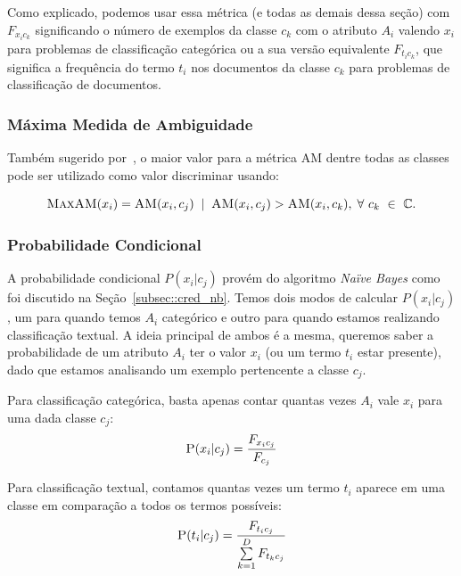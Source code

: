 Como explicado, podemos usar essa métrica (e todas as demais dessa seção) com $F_{x_{i}c_{k}}$ significando o número de exemplos da classe $c_k$ com o atributo $A_i$ valendo $x_i$ para problemas de classificação categórica ou a sua versão equivalente $F_{t_{i}c_{k}}$, que significa a frequência do termo $t_i$ nos documentos da classe $c_k$ para problemas de classificação de documentos.

\subsubsection{Máxima Medida de Ambiguidade}
\label{subsubsection::maxam}

Também sugerido por~\cite{Mengle08}, o maior valor para a métrica \textsc{AM} dentre todas as classes pode ser utilizado como valor discriminar usando:
 
 \begin{equation}\label{eqn::maxdom}
 \textsc{MaxAM}(x_i) = \textsc{AM}(x_i,c_j) \; \; | \;\; \textsc{AM}(x_i, c_j) > \textsc{AM}(x_i, c_k), \; \forall\ c_k\ \in\ \mathbb{C}.
\end{equation}


\subsubsection{Probabilidade Condicional} %
\label{subsubsection::pc}

A probabilidade condicional $P(x_i|c_j)$ provém do algoritmo \textit{Naïve Bayes} como foi discutido na Seção~\ref{subsec::cred_nb}.
Temos dois modos de calcular $P(x_i|c_j)$, um para quando temos $A_i$ categórico e outro para quando estamos realizando classificação textual.
A ideia principal de ambos é a mesma, queremos saber a probabilidade de um atributo $A_i$ ter o valor $x_i$ (ou um termo $t_i$ estar presente), dado que estamos analisando um exemplo pertencente a classe $c_j$.

Para classificação categórica, basta apenas contar quantas vezes $A_i$ vale $x_i$ para uma dada classe $c_j$:
    \begin{equation}\label{eqn::nbcattexto}
        \textsc{P}(x_i|c_j) = \frac{ F_{x_{i}c_{j}} }{ F_{c_{j}} } 
    \end{equation}
        
Para classificação textual, contamos quantas vezes um termo $t_i$ aparece em uma classe em comparação a todos os termos possíveis:
    \begin{equation}\label{eqn::nbcattexto}
       \textsc{P}(t_i|c_j) = \frac{ F_{t_{i}c_{j}} }{ \sum\limits^{D}_{k = 1} {  F_{t_{k}c_{j}}} } 
    \end{equation}

